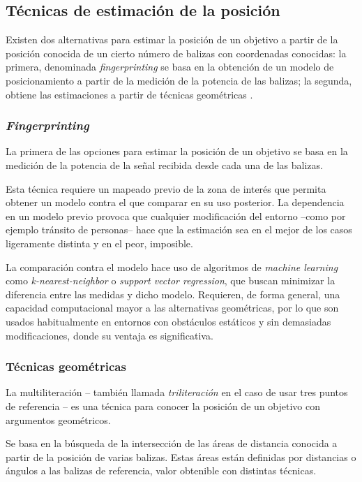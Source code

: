 \subsection{Técnicas de estimación de la posición}

Existen dos alternativas para estimar la posición de un objetivo a partir de la posición conocida de un cierto número de balizas con coordenadas conocidas: la primera, denominada \textit{fingerprinting} se basa en la obtención de un modelo de posicionamiento a partir de la medición de la potencia de las balizas; la segunda, obtiene las estimaciones a partir de técnicas geométricas \cite{MAIN}.

\subsubsection{\textit{Fingerprinting}}

La primera de las opciones para estimar la posición de un objetivo se basa en la medición de la potencia de la señal recibida desde cada una de las balizas.

Esta técnica requiere un mapeado previo de la zona de interés que permita obtener un modelo contra el que comparar en su uso posterior.
La dependencia en un modelo previo provoca que cualquier modificación del entorno --como por ejemplo tránsito de personas-- hace que la estimación sea en el mejor de los casos ligeramente distinta y en el peor, imposible.

La comparación contra el modelo hace uso de algoritmos de \textit{machine learning} como \textit{k-nearest-neighbor} o \textit{support vector regression}, que buscan minimizar la diferencia entre las medidas y dicho modelo. 
Requieren, de forma general, una capacidad computacional mayor a las alternativas geométricas, por lo que son usados habitualmente en entornos con obstáculos estáticos y sin demasiadas modificaciones, donde su ventaja es significativa.

\subsubsection{Técnicas geométricas}

La multiliteración -- también llamada \textit{triliteración} en el caso de usar tres puntos de referencia -- es una técnica para conocer la posición de un objetivo con argumentos geométricos.

Se basa en la búsqueda de la intersección de las áreas de distancia conocida a partir de la posición de varias balizas.
Estas áreas están definidas por distancias o ángulos a las balizas de referencia, valor obtenible con distintas técnicas.

